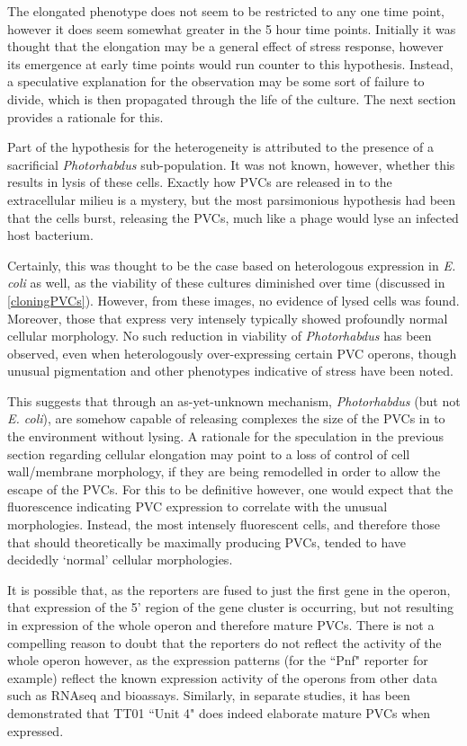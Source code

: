 The elongated phenotype does not seem to be restricted to any one time point, however it does seem somewhat greater in the 5 hour time points. Initially it was thought that the elongation may be a general effect of stress response, however its emergence at early time points would run counter to this hypothesis. Instead, a speculative explanation for the observation may be some sort of failure to divide, which is then propagated through the life of the culture. The next section provides a rationale for this.


Part of the hypothesis for the heterogeneity is attributed to the presence of a sacrificial \emph{Photorhabdus} sub-population. It was not known, however, whether this results in lysis of these cells. Exactly how PVCs are released in to the extracellular milieu is a mystery, but the most parsimonious hypothesis had been that the cells burst, releasing the PVCs, much like a phage would lyse an infected host bacterium.

Certainly, this was thought to be the case based on heterologous expression in \emph{E. coli} as well, as the viability of these cultures diminished over time (discussed in \vref{cloningPVCs}). However, from these images, no evidence of lysed cells was found. Moreover, those that express very intensely typically showed profoundly normal cellular morphology. No such reduction in viability of \emph{Photorhabdus} has been observed, even when heterologously over-expressing certain PVC operons, though unusual pigmentation and other phenotypes indicative of stress have been noted.

This suggests that through an as-yet-unknown mechanism, \emph{Photorhabdus} (but not \emph{E. coli}), are somehow capable of releasing complexes the size of the PVCs in to the environment without lysing. A rationale for the speculation in the previous section regarding cellular elongation may point to a loss of control of cell wall/membrane morphology, if they are being remodelled in order to allow the escape of the PVCs. For this to be definitive however, one would expect that the fluorescence indicating PVC expression to correlate with the unusual morphologies. Instead, the most intensely fluorescent cells, and therefore those that should theoretically be maximally producing PVCs, tended to have decidedly `normal' cellular morphologies.

It is possible that, as the reporters are fused to just the first gene in the operon, that expression of the 5' region of the gene cluster is occurring, but not resulting in expression of the whole operon and therefore mature PVCs. There is not a compelling reason to doubt that the reporters do not reflect the activity of the whole operon however, as the expression patterns (for the \Pasy{} ``Pnf" reporter for example) reflect the known expression activity of the operons from other data such as RNAseq and bioassays. Similarly, in separate studies, it has been demonstrated that \Plum{} TT01 ``Unit 4" does indeed elaborate mature PVCs when expressed.



